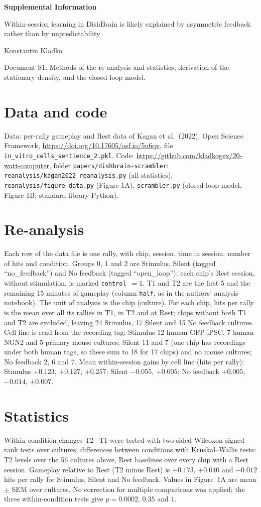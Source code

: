 \documentclass[11pt]{article}
\begin{document}
{\large\bfseries Supplemental Information}\par\smallskip
Within-session learning in DishBrain is likely explained by asymmetric feedback rather than by unpredictability\par
Konstantin Kladko\par\medskip
Document S1. Methods of the re-analysis and statistics, derivation of the stationary density, and the closed-loop model.

\section*{Data and code}
Data: per-rally gameplay and Rest data of Kagan et al.\ (2022), Open Science Framework, \url{https://doi.org/10.17605/osf.io/5u6qv}, file \texttt{in\_vitro\_cells\_sentience\_2.pkl}. Code: \url{https://github.com/kladkogex/20-watt-computer}, folder \texttt{papers/dishbrain-scrambler}: \texttt{reanalysis/kagan2022\_reanalysis.py} (all statistics), \texttt{reanalysis/figure\_data.py} (Figure 1A), \texttt{scrambler.py} (closed-loop model, Figure 1B; standard-library Python).

\section*{Re-analysis}
Each row of the data file is one rally, with chip, session, time in session, number of hits and condition. Groups 0, 1 and 2 are Stimulus, Silent (tagged ``no\_feedback'') and No feedback (tagged ``open\_loop''); each chip's Rest session, without stimulation, is marked \texttt{control}~$=1$. T1 and T2 are the first 5 and the remaining 15 minutes of gameplay (column \texttt{half}, as in the authors' analysis notebook). The unit of analysis is the chip (culture). For each chip, hits per rally is the mean over all its rallies in T1, in T2 and at Rest; chips without both T1 and T2 are excluded, leaving 24 Stimulus, 17 Silent and 15 No feedback cultures. Cell line is read from the recording tag: Stimulus 12 human GFP-iPSC, 7 human NGN2 and 5 primary mouse cultures; Silent 11 and 7 (one chip has recordings under both human tags, so these sum to 18 for 17 chips) and no mouse cultures; No feedback 2, 6 and 7. Mean within-session gains by cell line (hits per rally): Stimulus $+0.123$, $+0.127$, $+0.257$; Silent $-0.055$, $+0.005$; No feedback $+0.005$, $-0.014$, $+0.007$.

\section*{Statistics}
Within-condition changes T2$-$T1 were tested with two-sided Wilcoxon signed-rank tests over cultures; differences between conditions with Kruskal--Wallis tests: T2 levels over the 56 cultures above, Rest baselines over every chip with a Rest session. Gameplay relative to Rest (T2 minus Rest) is $+0.173$, $+0.040$ and $-0.012$ hits per rally for Stimulus, Silent and No feedback. Values in Figure~1A are mean $\pm$ SEM over cultures. No correction for multiple comparisons was applied; the three within-condition tests give $p=0.0002$, $0.35$ and $1$.
\end{document}
